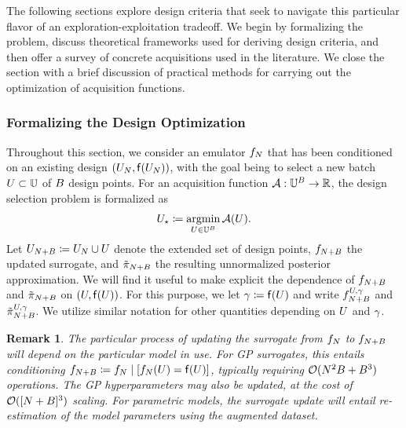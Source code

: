 \documentclass[12pt]{article}
\newtheorem{remark}{Remark}
\begin{document}
The following sections explore design criteria that seek to navigate this particular flavor of an exploration-exploitation tradeoff.
We begin by formalizing the problem, discuss theoretical frameworks used for deriving design criteria, and then 
offer a survey of concrete acquisitions used in the literature. We close the section with a brief discussion of practical methods for 
carrying out the optimization of acquisition functions. 

\subsubsection{Formalizing the Design Optimization}
Throughout this section, we consider an emulator $\targetEm$ that has been conditioned on an existing design 
$(\design, \target(\design))$, with the goal being to select a new batch $\ParBatch \subset \parSpace$ of $\Nbatch$ design points. 
For an acquisition function $\acq: \parSpace^\Nbatch \to \R$, the design selection problem is formalized as 
\begin{equation}
\ParBatchOpt \Def \argmin_{\ParBatch \in \parSpace^\Nbatch} \acq(\ParBatch).
\label{eq:acq-opt}
\end{equation}
Let $\ParBatchAug \Def \design \cup \ParBatch$ denote the extended set of design points, $\targetEm[\Naugment]$
the updated surrogate, and $\postEm[\Naugment]$ the resulting unnormalized posterior approximation. We will find 
it useful to make explicit the dependence of $\targetEm[\Naugment]$ and $\postEm[\Naugment]$ on 
$(\ParBatch, \target(\ParBatch))$. For this purpose, we let $\batchResponse \Def \target(\ParBatch)$ and write 
$\targetEm[\Naugment]^{\ParBatch,\batchResponse}$ and $\postEm[\Naugment]^{\ParBatch,\batchResponse}$.
We utilize similar notation for other quantities depending on $\ParBatch$ and $\batchResponse$.

\begin{remark}
The particular process of updating the surrogate from $\targetEm$ to $\targetEm[\Naugment]$ will depend on the
particular model in use. For GP surrogates, this entails conditioning 
$\targetEm[\Naugment] \Def \targetEm \given [\targetEm(\ParBatch) = \target(\ParBatch)]$, typically requiring 
$\BigO(\Ndesign^2 \Nbatch + \Nbatch^3)$ operations. The GP hyperparameters may also be updated, at the 
cost of $\BigO([\Ndesign + \Nbatch]^3)$ scaling. For parametric models, the surrogate update will entail 
re-estimation of the model parameters using the augmented dataset.
\end{remark}
\end{document}

